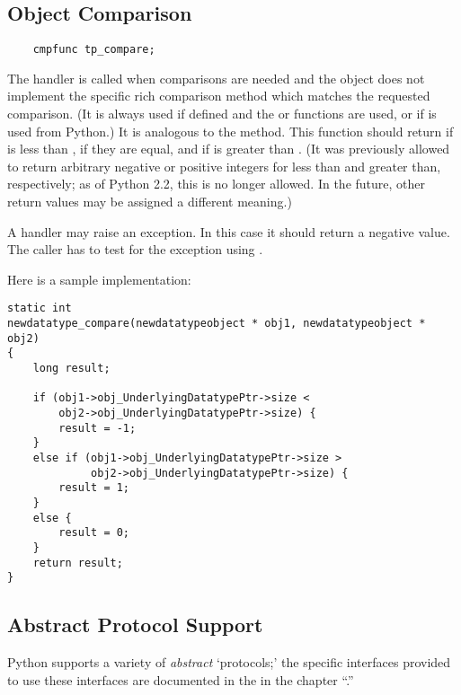\subsection{Object Comparison}

\begin{verbatim}
    cmpfunc tp_compare;
\end{verbatim}

The  handler is called when comparisons are needed
and the object does not implement the specific rich comparison method
which matches the requested comparison.  (It is always used if defined
and the  or 
functions are used, or if  is used from Python.)
It is analogous to the  method.  This function
should return  if  is less than
,  if they are equal, and  if
 is greater than
.
(It was previously allowed to return arbitrary negative or positive
integers for less than and greater than, respectively; as of Python
2.2, this is no longer allowed.  In the future, other return values
may be assigned a different meaning.)

A  handler may raise an exception.  In this case it
should return a negative value.  The caller has to test for the
exception using .


Here is a sample implementation:

\begin{verbatim}
static int
newdatatype_compare(newdatatypeobject * obj1, newdatatypeobject * obj2)
{
    long result;
 
    if (obj1->obj_UnderlyingDatatypePtr->size <
        obj2->obj_UnderlyingDatatypePtr->size) {
        result = -1;
    }
    else if (obj1->obj_UnderlyingDatatypePtr->size >
             obj2->obj_UnderlyingDatatypePtr->size) {
        result = 1;
    }
    else {
        result = 0;
    }
    return result;
}
\end{verbatim}


\subsection{Abstract Protocol Support}

Python supports a variety of \emph{abstract} `protocols;' the specific
interfaces provided to use these interfaces are documented in the
 in the
chapter ``.''

